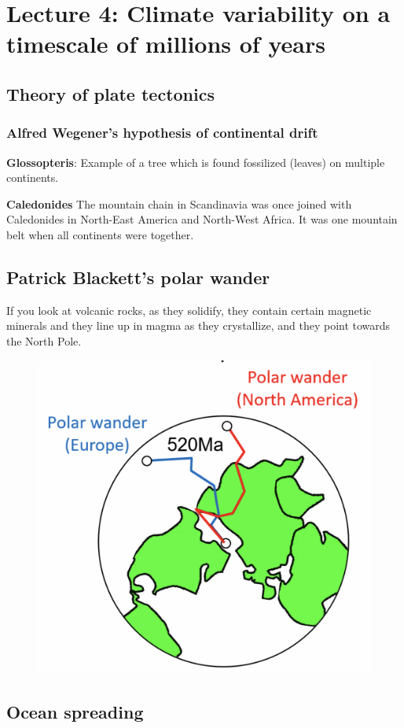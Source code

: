 \section{Lecture 4: Climate variability on a timescale of millions of years}

\subsection{Theory of plate tectonics}

\subsubsection{Alfred Wegener's hypothesis of continental drift}

\textbf{Glossopteris}: Example of a tree which is found fossilized (leaves)
on multiple continents.

\textbf{Caledonides}
The mountain chain in Scandinavia was once joined with Caledonides in
North-East America and North-West Africa. It was one mountain belt when all
continents were together.

\subsection{Patrick Blackett's polar wander}

If you look at volcanic rocks, as they solidify, they contain certain magnetic
minerals and they line up in magma as they crystallize, and they point towards
the North Pole.

\begin{figure}[H]
    \centering
    \includegraphics[width=0.5\linewidth]{content/img/polar_wander.png}
\end{figure}

\subsection{Ocean spreading}

